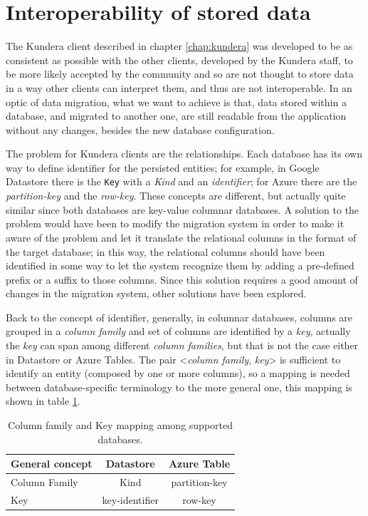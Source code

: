 
\section{Interoperability of stored data}
\label{sec:data-interoperability}
The Kundera client described in chapter \ref{chap:kundera} was developed to be as consistent as possible with the other clients, developed by the Kundera staff, to be more likely accepted by the community and so are not thought to store data in a way other clients can interpret them, and thus are not interoperable.
In an optic of data migration, what we want to achieve is that, data stored within a database, and migrated to another one, are still readable from the application without any changes, besides the new database configuration. 

\noindent The problem for Kundera clients are the relationships. Each database has its own way to define identifier for the persisted entities; for example, in Google Datastore there is the \texttt{Key} with a \textit{Kind} and an \textit{identifier}; for Azure there are the \textit{partition-key} and the \textit{row-key}. These concepts are different, but actually quite similar since both databases are key-value columnar databases. 
A solution to the problem would have been to modify the migration system in order to make it aware of the problem and let it translate the relational columns in the format of the target database; in this way, the relational columns should have been identified in some way to let the system recognize them by adding a pre-defined prefix or a suffix to those columns.
Since this solution requires a good amount of changes in the migration system, other solutions have been explored.
 
\newparagraph Back to the concept of identifier, generally, in columnar databases, columns are grouped in a \textit{column family} and set of columns are identified by a \textit{key}, actually the \textit{key} can span among different \textit{column families}, but that is not the case either in Datastore or Azure Tables.
The pair \textless\textit{column family}, \textit{key}\textgreater
is sufficient to identify an entity (composed by one or more columns), so a mapping is needed between database-specific terminology to the more general one, this mapping is shown in table \ref{table:mapping}.

\begin{table}[h]
\centering
\vspace{1em}
\renewcommand{\arraystretch}{1.4}
\begin{tabular}{lcc}
\hline
\textbf{General concept} & \textbf{Datastore} & \textbf{Azure Table}\\ 
\hline\hline
Column Family & Kind & partition-key \\
\hline
Key & key-identifier & row-key \\
\hline
\end{tabular}
\caption{Column family and Key mapping among supported databases.}
\label{table:mapping}
\end{table}

